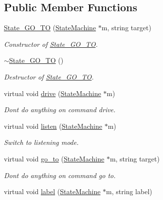 \subsection*{Public Member Functions}
\begin{DoxyCompactItemize}
\item 
\hyperlink{class_state___g_o___t_o_ad200bcfa107cbd4b1df514f074dcbf2d}{State\+\_\+\+G\+O\+\_\+\+TO} (\hyperlink{class_state_machine}{State\+Machine} $\ast$m, string target)
\begin{DoxyCompactList}\small\item\em Constructor of \hyperlink{class_state___g_o___t_o}{State\+\_\+\+G\+O\+\_\+\+TO}. \end{DoxyCompactList}\item 
\hyperlink{class_state___g_o___t_o_a1f796efa57a876af5d85d1cbe92c48f2}{$\sim$\+State\+\_\+\+G\+O\+\_\+\+TO} ()
\begin{DoxyCompactList}\small\item\em Destructor of \hyperlink{class_state___g_o___t_o}{State\+\_\+\+G\+O\+\_\+\+TO}. \end{DoxyCompactList}\item 
virtual void \hyperlink{class_state___g_o___t_o_aac09d9440545af49f32c947054bb9fcf}{drive} (\hyperlink{class_state_machine}{State\+Machine} $\ast$m)
\begin{DoxyCompactList}\small\item\em Don\textquotesingle{}t do anything on command drive. \end{DoxyCompactList}\item 
virtual void \hyperlink{class_state___g_o___t_o_a9ef62ef0417ecbadae9ba02cac1903bd}{listen} (\hyperlink{class_state_machine}{State\+Machine} $\ast$m)
\begin{DoxyCompactList}\small\item\em Switch to listening mode. \end{DoxyCompactList}\item 
virtual void \hyperlink{class_state___g_o___t_o_a31cad500afd9332090862e4eac34509a}{go\+\_\+to} (\hyperlink{class_state_machine}{State\+Machine} $\ast$m, string target)
\begin{DoxyCompactList}\small\item\em Don\textquotesingle{}t do anything on command go to. \end{DoxyCompactList}\item 
virtual void \hyperlink{class_state___g_o___t_o_a069ecbdf4f8e48e697cebd14da6be795}{label} (\hyperlink{class_state_machine}{State\+Machine} $\ast$m, string label)

\end{DoxyCompactItemize}
